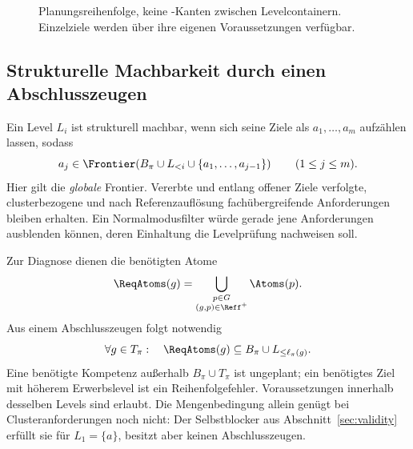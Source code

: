 \begin{figure}[htbp]
\centering
{}
\caption[Curriculare Erwerbsstufen]{Planungsreihenfolge, keine -Kanten zwischen
Levelcontainern. Einzelziele werden über ihre eigenen Voraussetzungen verfügbar.}
\label{fig:levels}
\end{figure}

\subsection{Strukturelle Machbarkeit durch einen Abschlusszeugen}
Ein Level $L_i$ ist strukturell machbar, wenn sich seine Ziele als
$a_1,\ldots,a_m$ aufzählen lassen, sodass
\begin{equation}
 a_j\in\Frontier\!\left(B_\pi\cup L_{<i}\cup
                         \{a_1,\ldots,a_{j-1}\}\right)
 \qquad(1\leq j\leq m).
 \label{eq:level-witness}
\end{equation}
Hier gilt die \emph{globale} Frontier. Vererbte und entlang offener Ziele verfolgte,
clusterbezogene und nach Referenzauflösung fachübergreifende Anforderungen
bleiben erhalten. Ein Normalmodusfilter würde gerade jene Anforderungen
ausblenden können, deren Einhaltung die Levelprüfung nachweisen soll.

Zur Diagnose dienen die benötigten Atome
\begin{equation}
 \ReqAtoms(g)=\bigcup_{\substack{p\in G\\(g,p)\in\Reff^+}}\Atoms(p).
 \label{eq:reqatoms}
\end{equation}
Aus einem Abschlusszeugen folgt notwendig
\begin{equation}
 \forall g\in T_\pi:\quad
 \ReqAtoms(g)\subseteq B_\pi\cup L_{\leq\ell_\pi(g)}.
 \label{eq:level-closure}
\end{equation}
Eine benötigte Kompetenz außerhalb $B_\pi\cup T_\pi$ ist ungeplant;
ein benötigtes Ziel mit höherem Erwerbslevel ist ein Reihenfolgefehler.
Voraussetzungen innerhalb desselben Levels sind erlaubt. Die Mengenbedingung
allein genügt bei Clusteranforderungen noch nicht: Der Selbstblocker aus
Abschnitt~\ref{sec:validity} erfüllt sie für $L_1=\{a\}$,
besitzt aber keinen Abschlusszeugen.

